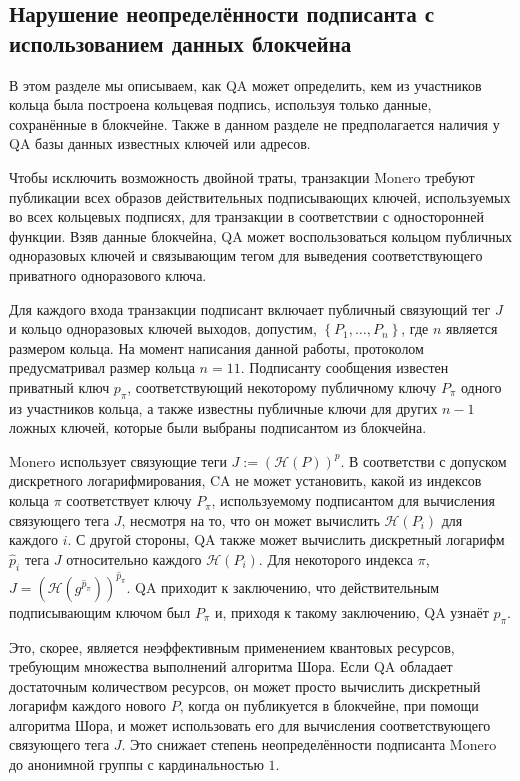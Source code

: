 \documentclass{mrl}
\begin{document}
\subsection{Нарушение неопределённости подписанта с использованием данных блокчейна}

В этом разделе мы описываем, как QA может определить, кем из участников кольца была построена кольцевая подпись, используя только данные, сохранённые в блокчейне. Также в данном разделе не предполагается наличия у QA базы данных известных ключей или адресов.

Чтобы исключить возможность двойной траты, транзакции Monero требуют публикации всех образов действительных подписывающих ключей, используемых во всех кольцевых подписях, для транзакции в соответствии с односторонней функции. Взяв данные блокчейна, QA может воспользоваться кольцом публичных одноразовых ключей и связывающим тегом для выведения соответствующего приватного одноразового ключа.

Для каждого входа транзакции подписант включает публичный связующий тег $J$ и кольцо одноразовых ключей выходов, допустим, $\left\{P_1, \ldots, P_n\right\}$, где $n$ является размером кольца. На момент написания данной работы, протоколом предусматривал размер кольца $n=11$. Подписанту сообщения известен приватный ключ $p_\pi$, соответствующий некоторому публичному ключу $P_\pi$ одного из участников кольца, а также известны публичные ключи для других $n-1$ ложных ключей, которые были выбраны подписантом из блокчейна.

Monero использует связующие теги $J := (\mathcal{H}(P))^{p}$. В соответстви с допуском дискретного логарифмирования, CA не может установить, какой из индексов кольца $\pi$ соответствует ключу $P_\pi$, используемому подписантом для вычисления связующего тега $J$, несмотря на то, что он может вычислить $\mathcal{H}(P_i)$ для каждого $i$. С другой стороны, QA также может вычислить дискретный логарифм $\widehat{p}_i$ тега $J$ относительно каждого $\mathcal{H}(P_i)$. Для некоторого индекса $\pi$, $J = (\mathcal{H}(g^{\widehat{p}_\pi}))^{\widehat{p}_\pi}$. QA приходит к заключению, что действительным подписывающим ключом был $P_\pi$ и, приходя к такому заключению, QA узнаёт $p_\pi$.

Это, скорее, является неэффективным применением квантовых ресурсов, требующим множества выполнений алгоритма Шора. Если QA обладает достаточным количеством ресурсов, он может просто вычислить дискретный логарифм каждого нового $P$, когда он публикуется в блокчейне, при помощи алгоритма Шора, и может использовать его для вычисления соответствующего связующего тега $J$. Это снижает степень неопределённости подписанта Monero до анонимной группы с кардинальностью $1$.
\end{document}

